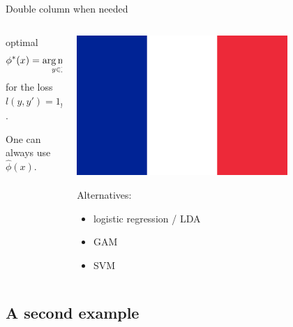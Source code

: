 \documentclass[unknownkeysallowed]{beamer}
\begin{document}
\begin{frame}{Double column when needed}
\begin{columns}
\begin{column}[T]{.48\textwidth}
	 optimal
	\begin{equation*}
	  \phi^*(x) = \operatorname*{arg\,max}_{y\in \mathcal{Y}} P(Y=y|X=x)
	\end{equation*}
	for the loss  $l(y,y')=1_{y\neq y'}$.

	\vspace{1cm}

	One can always use  $\widehat{\phi}(x)$.
\end{column}
\begin{column}[T]{.48\textwidth}
	\centering
	\includegraphics[width=0.75\textwidth]{french-flag}

	\vspace{1cm}

	Alternatives:
	\begin{itemize}
		\item logistic regression / LDA
		\item GAM
		\item SVM
	\end{itemize}
	\vspace{1cm}

\end{column}
\end{columns}
\end{frame}



\subsection{A second example}
\label{sub:deuxiem_exmple}
\end{document}
